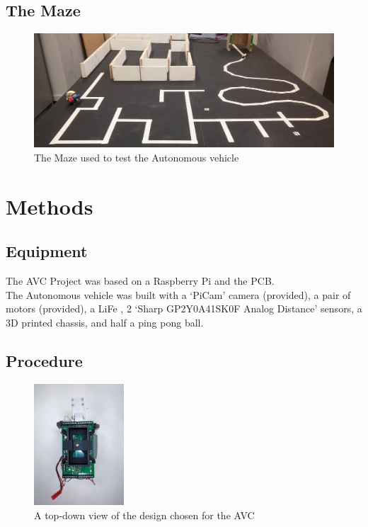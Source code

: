 \documentclass[paper=a4, fontsize=11pt]{scrartcl} %
\numberwithin{equation}{section} %
\numberwithin{figure}{section} %
\begin{document}
\subsection{The Maze}
\begin{figure}[h]
\includegraphics[width=\textwidth]{maze}
\centering
\caption{The Maze used to test the Autonomous vehicle}
\end{figure}



\section{Methods}
\subsection{Equipment}
The AVC Project was based on a Raspberry Pi and the PCB.\\
The Autonomous vehicle was built with a `PiCam' camera (provided), a pair of
motors (provided), a LiFe , 2 `Sharp GP2Y0A41SK0F Analog Distance' sensors, a 3D printed
chassis, and half a ping pong ball.
\subsection{Procedure}
\begin{figure}
\begin{center}
\includegraphics[width=0.3\textwidth]{top-down-view}
\caption{A top-down view of the design chosen for the AVC}
\end{center}
\end{figure}
\end{document}
